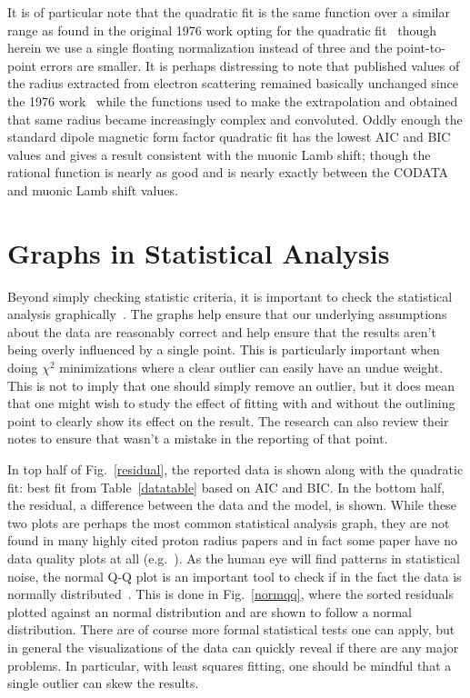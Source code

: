 \documentclass[10pt,aps,prc,twocolumn]{revtex4-1}
\begin{document}
It is of particular note that the quadratic fit is the same function over a similar range as found in the original 1976 work opting for
the quadratic fit~\cite{Borkowski:1975} though herein we 
use a single floating normalization instead of three and the point-to-point errors are smaller.   
It is perhaps distressing to note that published values of the 
radius extracted from electron scattering remained basically unchanged since the 1976 work~\cite{Borkowski:1975} while the 
functions used to make the extrapolation and obtained that same radius became increasingly complex and convoluted.
Oddly enough the standard dipole magnetic form factor quadratic fit has the lowest AIC and BIC values and gives a result consistent
with the muonic Lamb shift; though the rational function is nearly as good and is nearly exactly between the CODATA
and muonic Lamb shift values.    


\section{Graphs in Statistical Analysis}

Beyond simply checking statistic criteria, it is important to check the statistical analysis graphically~\cite{Anscombe:1973}.
The graphs help ensure that our underlying assumptions about the data are reasonably correct and help ensure that the results
aren't being overly influenced by a single point.   This is particularly important when doing $\chi^2$ minimizations where a
clear outlier can easily have an undue weight.    This is not to imply that one should simply remove an outlier, but it does
mean that one might wish to study the effect of fitting with and without the outlining point to clearly show its effect on 
the result.   The research can also review their notes to ensure that wasn't a mistake in the reporting of that point.

In top half of Fig.~\ref{residual}, the reported data is shown along with the quadratic fit:  best fit from Table~\ref{datatable} based
on AIC and BIC.   In the bottom half, the residual, a difference between the data and the model, is shown.     While these two plots
are perhaps the most common statistical analysis graph, they are not found in many highly cited proton radius papers and in fact some
paper  have no data quality plots at all (e.g.~\cite{Rosenfelder:1999cd}).
As the human eye will find patterns in statistical noise, the normal Q-Q plot is an important tool to check if in the fact the 
data is normally distributed~\cite{Wilk:1968}.   This is done in Fig.~\ref{normqq}, where the sorted residuals plotted against an normal distribution
and are shown to follow a normal distribution.   There are of course more formal statistical tests one can apply, but in general the
visualizations of the data can quickly reveal if there are any major problems.   In particular, with least squares fitting, one should
be mindful that a single outlier can skew the results.
\end{document}
